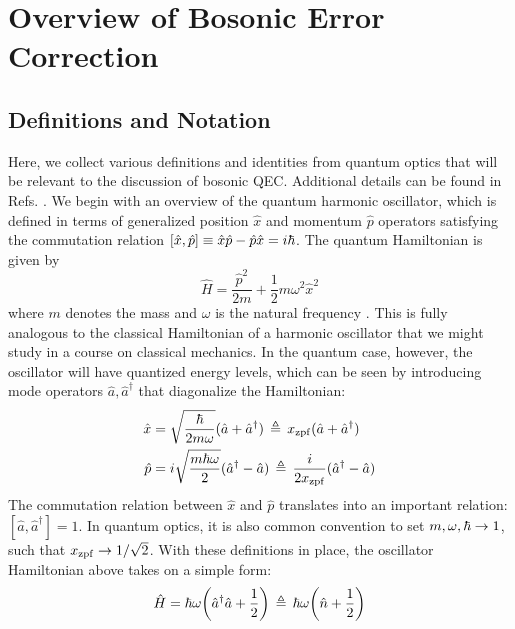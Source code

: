 

\section{Overview of Bosonic Error Correction}
\subsection{Definitions and Notation \label{sec:2_BosonicQEC_Definitions}}
Here, we collect various definitions and identities from quantum optics that will be relevant to the discussion of bosonic QEC. Additional details can be found in Refs. \cite{shankar1994principles, raimond2006exploring, grynberg2010introduction}. We begin with an overview of the quantum harmonic oscillator, which is defined in terms of generalized position $\hat{x}$ and momentum $\hat{p}$ operators satisfying the commutation relation $[\hat{x}, \hat{p}] \equiv \hat{x}\hat{p} - \hat{p}\hat{x} = i\hbar$. The quantum Hamiltonian is given by
\begin{equation}
    \hat{H} = \frac{\hat{p}^2}{2m} + \frac{1}{2}m\omega^2 \hat{x}^2
\end{equation}
where $m$ denotes the mass and $\omega$ is the natural frequency \cite{shankar1994principles}. This is fully analogous to the classical Hamiltonian of a harmonic oscillator that we might study in a course on classical mechanics. In the quantum case, however, the oscillator will have quantized energy levels, which can be seen by introducing mode operators $\hat{a}, \hat{a}^\dagger$ that diagonalize the Hamiltonian:
\begin{align}
\begin{split}
     \hat{x} &= \sqrt{\frac{\hbar}{2m\omega}}(\hat{a} + \hat{a}^\dagger) \,\triangleq\, x_{\rm zpf} (\hat{a} + \hat{a}^\dagger) \\
     \hat{p} &= i\sqrt{\frac{m\hbar\omega}{2}}(\hat{a}^\dagger - \hat{a}) \,\triangleq\, \frac{i}{2x_{\rm zpf}} (\hat{a}^\dagger - \hat{a})
\end{split}
\end{align}
The commutation relation between $\hat{x}$ and $\hat{p}$ translates into an important relation: $[\hat{a}, \hat{a}^\dagger] = 1$. In quantum optics, it is also common convention to set $m, \omega, \hbar \to 1$, such that $x_{\rm zpf} \to 1/\sqrt{2}$. With these definitions in place, the oscillator Hamiltonian above takes on a simple form:
\begin{equation}
    \hat{H} = \hbar\omega\bigg(\hat{a}^\dagger\hat{a} + \frac{1}{2}\bigg) \,\triangleq\, \hbar\omega\bigg(\hat{n} + \frac{1}{2}\bigg)
\end{equation}
